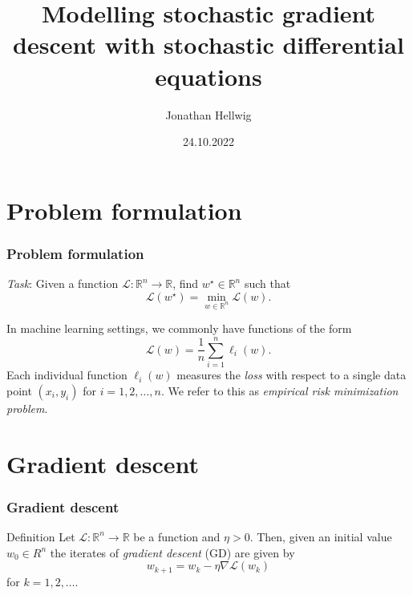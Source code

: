 \documentclass[17pt,institute=e10]{tuhh_presentation}
\title{Modelling stochastic gradient
descent with stochastic differential equations}
\date{24.10.2022}
\author[Jonathan Hellwig]{Jonathan Hellwig}
\newcommand{\R}{\mathbb{R}}
\newcommand{\Lo}{\mathcal{L} : \R^n \rightarrow \R}
\newcommand{\CL}{\mathcal{L}}
\begin{document}
\titlepage


\begin{frame}[agenda]
  \tableofcontents
\end{frame}

\section{Problem formulation}

\begin{frame}
  \frametitle{Problem formulation}
  \emph{Task}: Given a function $\CL : \R^n \rightarrow \R$, find $w^\star \in \R^n$ such that
  \begin{equation*}
    \CL(w^\star) = \min_{w \in \R^n} \CL(w).
  \end{equation*}

  In machine learning settings, we commonly have functions of the form
  \begin{equation*}
    \CL(w) = \frac{1}{n} \sum_{i=1}^n \ell_i(w).
  \end{equation*}
  Each individual function $\ell_i(w)$ measures the \textcolor{purple-pontifex}{\emph{loss}} with respect to a single data point $(x_i, y_i)$ for $i = 1,2, \dots, n$.
  We refer to this as \textcolor{purple-pontifex}{\emph{empirical risk minimization problem}}.
\end{frame}

\section{Gradient descent}

\begin{frame}[fragile]
  \frametitle{Gradient descent}

  \begin{block}{Definition}
    Let $\Lo$ be a function and $\eta > 0$. Then, given an initial value $w_0 \in R^n$ the iterates of \textcolor{purple-pontifex}{\emph{gradient descent}} (GD) are given by
  \begin{equation*}
    w_{k+1} = w_k - \eta \nabla \CL(w_k)
  \end{equation*}
  for $k = 1,2,\dots$.
  \end{block}

\end{frame}
\end{document}
